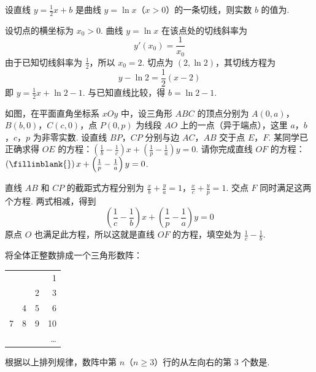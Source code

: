 \begin{problem}
设直线 \( y = \frac{1}{2}x + b \) 是曲线 \( y = \ln x \)（\(x > 0\)）的一条切线，则实数 \(b\) 的值为\fillinblank{}.
\end{problem}


\begin{solution}
设切点的横坐标为 \(x_0>0\). 曲线 \(y=\ln x\) 在该点处的切线斜率为
\[
y'(x_0)=\frac{1}{x_0}
\]
由于已知切线斜率为 \(\frac12\)，所以 \(x_0=2\). 切点为 \((2,\ln2)\)，其切线方程为
\[
y-\ln2=\frac12(x-2)
\]
即 \(y=\frac12x+\ln2-1\). 与已知直线比较，得 \(b=\ln2-1\).
\end{solution}

\begin{problem}
如图，在平面直角坐标系 \(xOy\) 中，设三角形 \(ABC\) 的顶点分别为 \(A(0, a)\)，\(B(b, 0)\)，\(C(c, 0)\)，点 \(P(0, p)\) 为线段 \(AO\) 上的一点（异于端点），这里 \(a\)，\(b\)，\(c\)，\(p\) 为非零实数. 设直线 \(BP\)，\(CP\) 分别与边 \(AC\)，\(AB\) 交于点 \(E\)，\(F\). 某同学已正确求得 \(OE\) 的方程：\(\left(\frac{1}{b} - \frac{1}{c}\right)x + \left(\frac{1}{p} - \frac{1}{a}\right)y = 0\). 请你完成直线 \(OF\) 的方程：\(\left(\fillinblank{}\right) x + \left(\frac{1}{p} - \frac{1}{a}\right)y = 0\).
\end{problem}


\begin{solution}
直线 \(AB\) 和 \(CP\) 的截距式方程分别为
\(\frac{x}{b}+\frac{y}{a}=1\)，\(\frac{x}{c}+\frac{y}{p}=1\).
交点 \(F\) 同时满足这两个方程. 两式相减，得到
\[
\left(\frac1c-\frac1b\right)x+\left(\frac1p-\frac1a\right)y=0
\]
原点 \(O\) 也满足此方程，所以这就是直线 \(OF\) 的方程，填空处为 \(\frac1c-\frac1b\).
\end{solution}

\begin{problem}
将全体正整数排成一个三角形数阵：
\begin{center}
\begin{tabular}{r r r r}
& & & 1 \\
& & 2 & 3 \\
& 4 & 5 & 6 \\
7 & 8 & 9 & 10 \\
& & & \dots
\end{tabular}
\end{center}
根据以上排列规律，数阵中第 \(n\)（\(n \geqslant 3\)）行的从左向右的第 \(3\) 个数是\fillinblank{}.
\end{problem}

